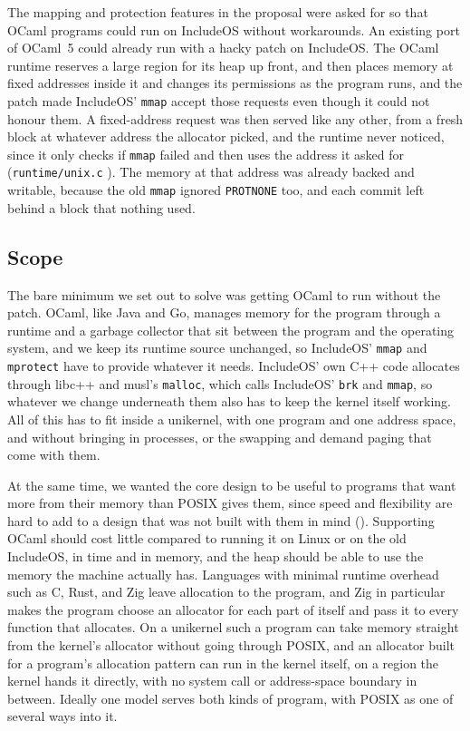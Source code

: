 \documentclass[12pt]{report}
\newcommand{\fullref}[1]{\Cref{#1}}
\renewcommand{\_}{\origunderscore\allowbreak}
\begin{document}
The mapping and protection features in the proposal were asked for so that OCaml programs could run on IncludeOS without workarounds. An existing port of OCaml~5 \cite{skjegstad2025runtimes} could already run with a hacky patch on IncludeOS. The OCaml runtime reserves a large region for its heap up front, and then places memory at fixed addresses inside it and changes its permissions as the program runs, and the patch made IncludeOS' \texttt{mmap} accept those requests even though it could not honour them. A fixed-address request was then served like any other, from a fresh block at whatever address the allocator picked, and the runtime never noticed, since it only checks if \texttt{mmap} failed and then uses the address it asked for (\texttt{runtime/unix.c} \cite{ocaml2025source}). The memory at that address was already backed and writable, because the old \texttt{mmap} ignored \texttt{PROT\_NONE} too, and each commit left behind a block that nothing used.

\subsection{Scope}
\label{sec:restrictions}

The bare minimum we set out to solve was getting OCaml to run without the patch. OCaml, like Java and Go, manages memory for the program through a runtime and a garbage collector that sit between the program and the operating system, and we keep its runtime source unchanged, so IncludeOS' \texttt{mmap} and \texttt{mprotect} have to provide whatever it needs. IncludeOS' own C++ code allocates through libc++ and musl's \texttt{malloc}, which calls IncludeOS' \texttt{brk} and \texttt{mmap}, so whatever we change underneath them also has to keep the kernel itself working. All of this has to fit inside a unikernel, with one program and one address space, and without bringing in processes, or the swapping and demand paging that come with them.

At the same time, we wanted the core design to be useful to programs that want more from their memory than POSIX gives them, since speed and flexibility are hard to add to a design that was not built with them in mind (\fullref{sec:discussion-design}). Supporting OCaml should cost little compared to running it on Linux or on the old IncludeOS, in time and in memory, and the heap should be able to use the memory the machine actually has. Languages with minimal runtime overhead such as C, Rust, and Zig leave allocation to the program, and Zig in particular makes the program choose an allocator for each part of itself and pass it to every function that allocates. On a unikernel such a program can take memory straight from the kernel's allocator without going through POSIX, and an allocator built for a program's allocation pattern can run in the kernel itself, on a region the kernel hands it directly, with no system call or address-space boundary in between. Ideally one model serves both kinds of program, with POSIX as one of several ways into it.
\end{document}
